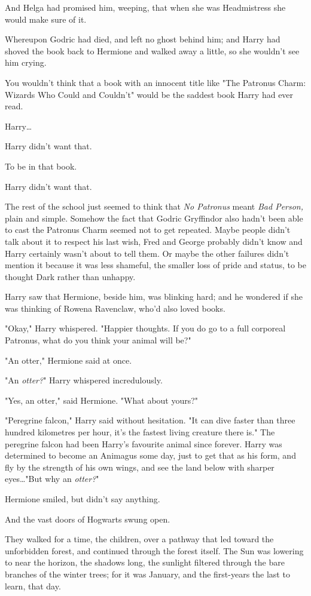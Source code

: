 And Helga had promised him, weeping, that when she was Headmistress she would
make sure of it.

Whereupon Godric had died, and left no ghost behind him; and Harry had shoved
the book back to Hermione and walked away a little, so she wouldn't see him
crying.

You wouldn't think that a book with an innocent title like "The Patronus Charm:
Wizards Who Could and Couldn't" would be the saddest book Harry had ever read.

Harry…

Harry didn't want that.

To be in that book.

Harry didn't want that.

The rest of the school just seemed to think that \emph{No Patronus} meant
\emph{Bad Person,} plain and simple. Somehow the fact that Godric Gryffindor
also hadn't been able to cast the Patronus Charm seemed not to get repeated.
Maybe people didn't talk about it to respect his last wish, Fred and George
probably didn't know and Harry certainly wasn't about to tell them. Or maybe
the other failures didn't mention it because it was less shameful, the smaller
loss of pride and status, to be thought Dark rather than unhappy.

Harry saw that Hermione, beside him, was blinking hard; and he wondered if she
was thinking of Rowena Ravenclaw, who'd also loved books.

"Okay," Harry whispered. "Happier thoughts. If you do go to a full corporeal
Patronus, what do you think your animal will be?"

"An otter," Hermione said at once.

"An \emph{otter?}" Harry whispered incredulously.

"Yes, an otter," said Hermione. "What about yours?"

"Peregrine falcon," Harry said without hesitation. "It can dive faster than
three hundred kilometres per hour, it's the fastest living creature there is."
The peregrine falcon had been Harry's favourite animal since forever. Harry was
determined to become an Animagus some day, just to get that as his form, and fly
by the strength of his own wings, and see the land below with sharper
eyes…"But why an \emph{otter?}"

Hermione smiled, but didn't say anything.

And the vast doors of Hogwarts swung open.

They walked for a time, the children, over a pathway that led toward the
unforbidden forest, and continued through the forest itself. The Sun was
lowering to near the horizon, the shadows long, the sunlight filtered through
the bare branches of the winter trees; for it was January, and the first-years
the last to learn, that day.

